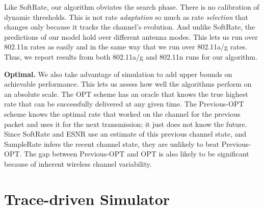 Like SoftRate, our algorithm obviates the search phase. There is no calibration of dynamic thresholds. This is not rate \emph{adaptation} so much as rate \emph{selection} that changes only because it tracks the channel's evolution. And unlike SoftRate, the predictions of our model hold over different antenna modes. This lets us run over 802.11n rates as easily and in the same way that we run over 802.11a/g rates. Thus, we report results from both 802.11a/g and 802.11n runs for our algorithm.

\textbf{Optimal.} We also take advantage of simulation to add upper bounds on achievable performance. This lets us assess how well the algorithms perform on an absolute scale. The OPT scheme has an oracle that knows the true highest rate that can be successfully delivered at any given time. The Previous-OPT scheme knows the optimal rate that worked on the channel for the previous packet and uses it for the next transmission; it just does not know the future. Since SoftRate and ESNR use an estimate of this previous channel state, and SampleRate infers the recent channel state, they are unlikely to beat Previous-OPT\@. The gap between Previous-OPT and OPT is also likely to be significant because of inherent wireless channel variability.


\section{Trace-driven Simulator}


